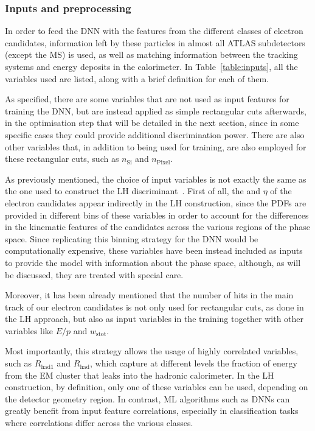 \subsubsection{Inputs and preprocessing}
\label{inputs_preproc}
In order to feed the DNN with the features from the different classes of electron candidates, information left by these particles in almost all ATLAS subdetectors (except the MS) is used, as well as matching information between the tracking systems and energy deposits in the calorimeter. 
In Table~\ref{table:inputs}, all the variables used are listed, along with a brief definition for each of them.

As specified, there are some variables that are not used as input features for training the DNN, but are instead applied as simple rectangular cuts afterwards, in the optimisation step that will be detailed in the next section, since in some specific cases they could provide additional discrimination power. There are also other variables that, in addition to being used for training, are also employed for these rectangular cuts, such as $n_{\text{Si}}$ and $n_{\text{Pixel}}$.

As previously mentioned, the choice of input variables is not exactly the same as the one used to construct the LH discriminant~\cite{Aaboud:2657964}. First of all, the \et and $\eta$ of the electron candidates appear indirectly in the LH construction, since the PDFs are provided in different bins of these variables in order to account for the differences in the kinematic features of the candidates across the various regions of the phase space. Since replicating this binning strategy for the DNN would be computationally expensive, these variables have been instead included as inputs to provide the model with information about the phase space, although, as will be discussed, they are treated with special care.

Moreover, it has been already mentioned that the number of hits in the main track of our electron candidates is not only used for rectangular cuts, as done in the LH approach, but also as input variables in the training together with other variables like $E/p$ and $w_{\text{stot}}$. 

Most importantly, this strategy allows the usage of highly correlated variables, such as $R_{\text{had1}}$ and $R_{\text{had}}$, which capture at different levels the fraction of energy from the EM cluster that leaks into the hadronic calorimeter. In the LH construction, by definition, only one of these variables can be used, depending on the detector geometry region. In contrast, ML algorithms such as DNNs can greatly benefit from input feature correlations, especially in classification tasks where correlations differ across the various classes.

